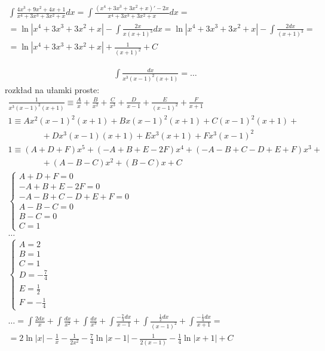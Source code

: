 
\begin{gather*}\int \frac{4x^3+9x^2+4x+1}{x^4+3x^3+3x^2+x}dx = \int \frac{(x^4+3x^3+3x^2+x)'-2x}{x^4+3x^3+3x^2+x}dx = \\
= \ln|x^4+3x^3+3x^2+x|-\int \frac{2x}{x(x+1)^3}dx = \ln|x^4+3x^3+3x^2+x| - \int \frac{2dx}{(x+1)^3} = \\
= \ln|x^4+3x^3+3x^2+x| + \frac{1}{(x+1)^2}+C\end{gather*}



\begin{gather*}\int \frac{dx}{x^3(x-1)^2(x+1)}=\ldots\end{gather*}
rozkład na ułamki proste:
\begin{gather*}\frac{1}{x^3(x-1)^2(x+1)} \equiv \frac{A}{x}+\frac{B}{x^2}+\frac{C}{x^3} + \frac{D}{x-1}+\frac{E}{(x-1)^2}+\frac{F}{x+1} \\
1 \equiv Ax^2(x-1)^2(x+1)+Bx(x-1)^2(x+1)+C(x-1)^2(x+1) + \\
  \qquad \qquad + Dx^3(x-1)(x+1)+Ex^3(x+1)+Fx^3(x-1)^2 \\
1 \equiv (A+D+F)x^5+(-A+B+E-2F)x^4+(-A-B+C-D+E+F)x^3 + \\
  \qquad \qquad +(A-B-C)x^2+(B-C)x+C \\
\begin{cases} A+D+F=0 \\ -A+B+E-2F=0 \\ -A-B+C-D+E+F=0 \\ A-B-C=0 \\ B-C=0 \\ C=1 \end{cases} \\
\ldots \\
\begin{cases} A=2 \\ B=1 \\ C=1 \\ D=-\frac{7}{4} \\ E=\frac{1}{2} \\ F=-\frac{1}{4} \end{cases} \\
\ldots = \int \frac{2dx}{x} + \int \frac{dx}{x^2} + \int \frac{dx}{x^3} + \int \frac{-\frac{7}{4}dx}{x-1}+\int \frac{\frac{1}{2}dx}{(x-1)^2}+\int \frac{-\frac{1}{4}dx}{x+1} = \\
= 2\ln|x| - \frac{1}{x} - \frac{1}{2x^2} -\frac{7}{4}\ln|x-1|-\frac{1}{2(x-1)}-\frac{1}{4}\ln|x+1|+C\end{gather*}



